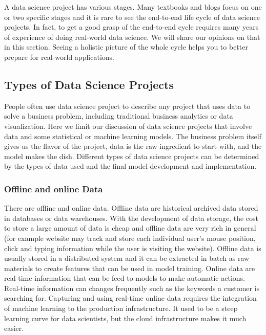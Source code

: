 \documentclass[12pt,]{krantz}
\begin{document}
A data science project has various stages. Many textbooks and blogs focus on one or two specific stages and it is rare to see the end-to-end life cycle of data science projects. In fact, to get a good grasp of the end-to-end cycle requires many years of experience of doing real-world data science. We will share our opinions on that in this section. Seeing a holistic picture of the whole cycle helps you to better prepare for real-world applications.

\hypertarget{types-of-data-science-projects}{%
\subsection{Types of Data Science Projects}\label{types-of-data-science-projects}}

People often use data science project to describe any project that uses data to solve a business problem, including traditional business analytics or data visualization. Here we limit our discussion of data science projects that involve data and some statistical or machine learning models. The business problem itself gives us the flavor of the project, data is the raw ingredient to start with, and the model makes the dish. Different types of data science projects can be determined by the types of data used and the final model development and implementation.

\hypertarget{offline-and-online-data}{%
\subsubsection{Offline and online Data}\label{offline-and-online-data}}

There are offline and online data. Offline data are historical archived data stored in databases or data warehouses. With the development of data storage, the cost to store a large amount of data is cheap and offline data are very rich in general (for example website may track and store each individual user's mouse position, click and typing information while the user is visiting the website). Offline data is usually stored in a distributed system and it can be extracted in batch as raw materials to create features that can be used in model training. Online data are real-time information that can be feed to models to make automatic actions. Real-time information can changes frequently such as the keywords a customer is searching for. Capturing and using real-time online data requires the integration of machine learning to the production infrastructure. It used to be a steep learning curve for data scientists, but the cloud infrastructure makes it much easier.
\end{document}
